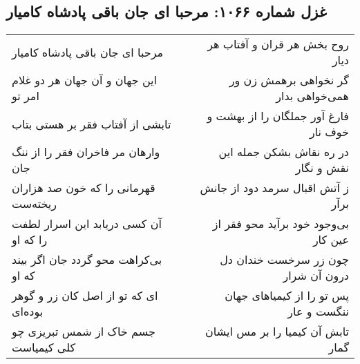\begin{center}
\section*{غزل شماره ۱۰۶۶: مرحبا ای جان باقی پادشاه کامیار}
\label{sec:1066}
\begin{longtable}{l p{0.5cm} r}
مرحبا ای جان باقی پادشاه کامیار
&&
روح بخش هر قران و آفتاب هر دیار
\\
این جهان و آن جهان هر دو غلام امر تو
&&
گر نخواهی برهمش زن ور همی‌خواهی بدار
\\
تابشی از آفتاب فقر بر هستی بتاب
&&
فارغ آور جملگان را از بهشت و خوف نار
\\
وارهان مر فاخران فقر را از ننگ جان
&&
در ره نقاش بشکن جمله این نقش و نگار
\\
قهرمانی را که خون صد هزاران ریخته‌ست
&&
ز آتش اقبال سرمد دود از جانش برآر
\\
آن کسی دریابد این اسرار لطفت را که او
&&
بی‌وجود خود برآید محو فقر از عین کار
\\
بی‌کراهت محو گردد جان اگر بیند که او
&&
چون زر سرخست خندان دل درون آن شرار
\\
ای که تو از اصل کان زر و گوهر بوده‌ای
&&
پس تو را از کیمیاهای جهان ننگست و عار
\\
جسم خاک از شمس تبریزی چو کلی کیمیاست
&&
تابش آن کیمیا را بر مس ایشان گمار
\\
\end{longtable}
\end{center}
